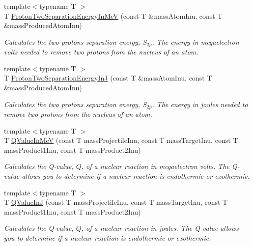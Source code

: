 \begin{DoxyCompactItemize}
{\footnotesize template$<$typename T $>$ }\\T \mbox{\hyperlink{group___e_g_x_phys-_nuclear_separation_energy_ga0de42783a7c650eb32f85dc2d40d84d7}{Proton\+Two\+Separation\+Energy\+In\+MeV}} (const T \&mass\+Atom\+Inu, const T \&mass\+Produced\+Atom\+Inu)
\begin{DoxyCompactList}\small\item\em Calculates the two protons separation energy, $S_{2p}$. The energy in megaelectron volts needed to remove two protons from the nucleus of an atom. \end{DoxyCompactList}\item 
{\footnotesize template$<$typename T $>$ }\\T \mbox{\hyperlink{group___e_g_x_phys-_nuclear_separation_energy_gad7c1d4a32daa8aaa53c5fce37c421f82}{Proton\+Two\+Separation\+Energy\+InJ}} (const T \&mass\+Atom\+Inu, const T \&mass\+Produced\+Atom\+Inu)
\begin{DoxyCompactList}\small\item\em Calculates the two protons separation energy, $S_{2p}$. The energy in joules needed to remove two protons from the nucleus of an atom. \end{DoxyCompactList}\item 
{\footnotesize template$<$typename T $>$ }\\T \mbox{\hyperlink{group___e_g_x_phys-_q_value_gab96ade2d74f5303e30a43ff97bd03841}{Q\+Value\+In\+MeV}} (const T mass\+Projectile\+Inu, const T mass\+Target\+Inu, const T mass\+Product1\+Inu, const T mass\+Product2\+Inu)
\begin{DoxyCompactList}\small\item\em Calculates the Q-\/value, $Q$, of a nuclear reaction in megaelectron volts. The Q-\/value allows you to determine if a nuclear reaction is endothermic or exothermic. \end{DoxyCompactList}\item 
{\footnotesize template$<$typename T $>$ }\\T \mbox{\hyperlink{group___e_g_x_phys-_q_value_ga4b23be4fb0a3a9e7229c95377afc74b5}{Q\+Value\+InJ}} (const T mass\+Projectile\+Inu, const T mass\+Target\+Inu, const T mass\+Product1\+Inu, const T mass\+Product2\+Inu)
\begin{DoxyCompactList}\small\item\em Calculates the Q-\/value, $Q$, of a nuclear reaction in joules. The Q-\/value allows you to determine if a nuclear reaction is endothermic or exothermic. \end{DoxyCompactList}\item 

\end{DoxyCompactItemize}
